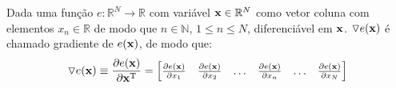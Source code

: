 \begin{proposition}\label{def:gradient}
 Dada uma função $e:\mathbb{R}^{N}\rightarrow \mathbb{R}$ com variável $\VECTOR{x} \in \mathbb{R}^{N}$
 como vetor coluna com elementos $x_n\in \mathbb{R}$ de modo que $n\in \mathbb{N}$, $1 \leq n \leq N$,
 diferenciável em $\VECTOR{x}$. 
 $\triangledown e(\VECTOR{x})$ é chamado gradiente \cite{Gradient} \FALTAREFERENCIA   de $e(\VECTOR{x})$, de modo que: 
 \begin{equation}
  \triangledown e(\VECTOR{x})\equiv \frac{\partial e(\VECTOR{x})}{\partial \VECTOR{x}^{\transpose} }=
\left[
\begin{matrix}
\frac{\partial e(\VECTOR{x}) }{\partial x_{1}}&
\frac{\partial e(\VECTOR{x}) }{\partial x_{2}}&
\hdots&
\frac{\partial e(\VECTOR{x}) }{\partial x_{n}}&
\hdots&
\frac{\partial e(\VECTOR{x}) }{\partial x_{N}}
\end{matrix}
\right]
 \end{equation}
\end{proposition}


